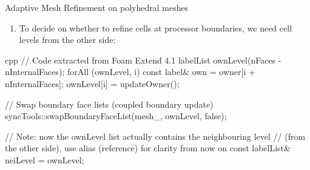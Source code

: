 \begin{frame}[fragile]{Adaptive Mesh Refinement on polyhedral meshes}

    \begin{enumerate}\addtocounter{enumi}{1}
        \item To decide on whether to refine cells at processor boundaries, we need cell levels from the other side:
    \end{enumerate}
\begin{CodeEnvNoComment}{cpp}{\scriptsize}
// Code extracted from Foam Extend 4.1
labelList ownLevel(nFaces - nInternalFaces);
forAll (ownLevel, i)
{
    const label& own = owner[i + nInternalFaces];
    ownLevel[i] = updateOwner();
}

// Swap boundary face lists (coupled boundary update)
syncTools::swapBoundaryFaceList(mesh_, ownLevel, false);

// Note: now the ownLevel list actually contains the neighbouring level
// (from the other side), use alias (reference) for clarity from now on
const labelList& neiLevel = ownLevel;
\end{CodeEnvNoComment}
\end{frame}
